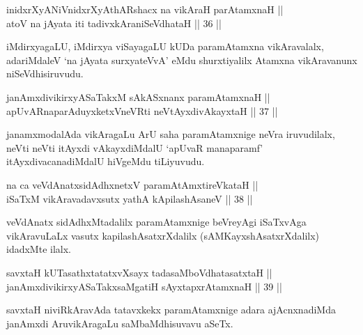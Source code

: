 
\begin{shl}
inidxrXyANiVnidxrXyAthARshacx na vikAraH parAtamxnaH || \\
atoV na jAyata iti tadivxkAraniSeVdhataH \hfill || 36 ||  
\end{shl}

\begin{artha}
iMdirxyagaLU, iMdirxya viSayagaLU kUDa paramAtamxna vikAravalalx,
adariMdaleV `na jAyata surxyateVvA' eMdu shurxtiyalilx Atamxna
vikAravanunx niSeVdhisiruvudu.
\end{artha}

\begin{shl}
janAmxdivikirxyASaTakxM sAkASxnanx paramAtamxnaH || \\
apUvARnaparAduyxketxVneVRti neVtAyxdivAkayxtaH \hfill || 37 ||  
\end{shl}

\begin{artha}
janamxmodalAda vikAragaLu ArU saha paramAtamxnige neVra iruvudilalx,
neVti neVti itAyxdi vAkayxdiMdalU `apUvaR manaparamf'
itAyxdivacanadiMdalU hiVgeMdu tiLiyuvudu.
\end{artha}


\begin{shl}
na ca veVdAnatxsidAdhxnetxV paramAtAmxtireVkataH || \\
iSaTxM vikAravadavxsutx yathA kApilashAsaneV \hfill || 38 || 
\end{shl}

\begin{artha}
veVdAnatx sidAdhxMtadalilx paramAtamxnige beVreyAgi iSaTxvAga
vikAravuLaLx vasutx kapilashAsatxrXdalilx (sAMKayxshAsatxrXdalilx) idadxMte ilalx.
\end{artha}


\begin{shl}
savxtaH kUTasathxtatatxvXsayx tadasaMboVdhatasatxtaH || \\
janAmxdivikirxyASaTakxsaMgatiH sAyxtapxrAtamxnaH \hfill || 39 ||  
\end{shl}

\begin{artha}
savxtaH niviRkAravAda tatavxkekx paramAtamxnige adara ajAcnxnadiMda
janAmxdi AruvikAragaLu saMbaMdhisuvavu aSeTx.
\end{artha}

